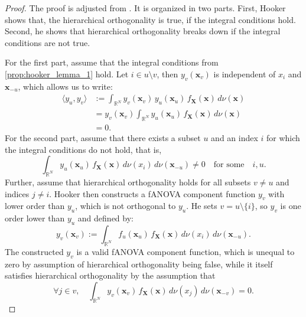 \begin{proof}
    The proof is adjusted from \cite{hooker2007}. It is organized in two parts. First, Hooker shows that, the hierarchical orthogonality is true, if the integral conditions hold. Second, he shows that hierarchical orthogonality breaks down if the integral conditions are not true.\par
    For the first part, assume that the integral conditions from \autoref{prop:hooker_lemma_1} hold. Let $i \in u \setminus v$, then $y_v(\boldsymbol{x}_v)$ is independent of $x_i$ and $\boldsymbol{x}_{-u}$, which allows us to write:
\begin{align*}
\langle y_u, y_v \rangle 
&:= \int_{\mathbb{R}^N} 
        y_v(\boldsymbol{x}_v)\, y_u(\boldsymbol{x}_u)\, 
        f_{\boldsymbol{X}}(\boldsymbol{x})\, 
        d \nu(\boldsymbol{x}) \\[0.3em]
&= y_v(\boldsymbol{x}_v) 
   \int_{\mathbb{R}^N} 
        y_u(\boldsymbol{x}_u)\, 
        f_{\boldsymbol{X}}(\boldsymbol{x})\, 
        d \nu(\boldsymbol{x}) \\[0.3em]
&= 0.
\end{align*}
For the second part, assume that there exists a subset $u$ and an index $i$ for which the integral conditions do not hold, that is,
\begin{equation*}
    \int_{\mathbb{R}^N} y_u(\boldsymbol{x}_u)\, f_{\boldsymbol{X}}(\boldsymbol{x})\, d \nu (x_i)\, d \nu (\boldsymbol{x}_{-u}) \ne 0 
    \quad \text{for some} \quad i, u.
\end{equation*}
Further, assume that hierarchical orthogonality holds for all subsets $v \neq u$ and indices $j \neq i$. 
Hooker then constructs a fANOVA component function $y_v$ with lower order than $y_u$, which is not orthogonal to $y_u$. 
He sets $v = u \setminus \{i\}$, so $y_v$ is one order lower than $y_u$ and defined by:
\begin{equation*}
    y_v(\boldsymbol{x}_v) := \int_{\mathbb{R}^N} f_u(\boldsymbol{x}_u) \, f_{\boldsymbol{X}}(\boldsymbol{x}) \, d \nu (x_i) \, d \nu (\boldsymbol{x}_{-u}).
\end{equation*}
The constructed \(y_v\) is a valid fANOVA component function, which is unequal to zero by assumption of hierarchical orthogonality being false, while it itself satisfies hierarchical orthogonality by the assumption that
\begin{equation*}
    \forall j \in v, \quad \int_{\mathbb{R}^N} y_v(\boldsymbol{x}_v) \, f_{\boldsymbol{X}}(\boldsymbol{x}) \, d \nu (x_j) \, d \nu (\boldsymbol{x}_{-v}) = 0.

\end{equation*}
\end{proof}
